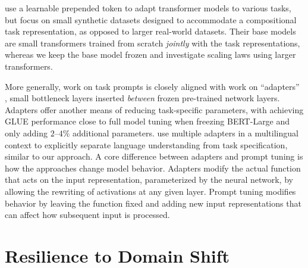 \documentclass[11pt]{article}
\begin{document}
\citet{logeswaranFewshotSequenceLearning2020} use a learnable prepended token to adapt transformer models to various tasks, but focus on small synthetic datasets designed to accommodate a compositional task representation, as opposed to larger real-world datasets. Their base models are small transformers trained from scratch \emph{jointly} with the task representations, whereas we keep the base model frozen and investigate scaling laws using larger transformers.

More generally, work on task prompts is closely aligned with work on ``adapters'' \cite{rebuffi_2017_adapters, houlsby_2019_adapters}, small bottleneck layers inserted \emph{between} frozen pre-trained network layers. Adapters offer another means of reducing task-specific parameters, with \citet{houlsby_2019_adapters} achieving GLUE performance close to full model tuning when freezing BERT-Large and only adding $2$--$4$\% additional parameters. \citet{pfeiffer-etal-2020-mad} use multiple adapters in a multilingual context to explicitly separate language understanding from task specification, similar to our approach. A core difference between adapters and prompt tuning is how the approaches change model behavior. Adapters modify the actual function that acts on the input representation, parameterized by the neural network, by allowing the rewriting of activations at any given layer. Prompt tuning modifies behavior by leaving the function fixed and adding new input representations that can affect how subsequent input is processed.

\section{Resilience to Domain Shift}
\label{sec:shift}
\end{document}
